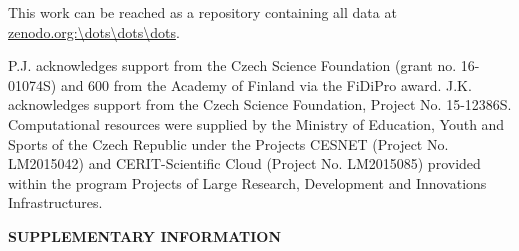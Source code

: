 \documentclass[aip,jcp,twocolumn]{revtex4}
\begin{document}




This work can be reached as a repository containing all data at \url{zenodo.org:\dots\dots\dots}.



\begin{acknowledgments}
P.J. acknowledges support from the Czech Science Foundation (grant no. 16-01074S) 
and 600 from the Academy of Finland via the FiDiPro award.
J.K. acknowledges support from the Czech Science Foundation, Project No. 15-12386S.
Computational resources were supplied by the Ministry of Education, Youth and Sports of the Czech Republic under the Projects CESNET (Project No. LM2015042) and CERIT-Scientific Cloud (Project No. LM2015085) provided within the program Projects of Large Research, Development and Innovations Infrastructures.
\end{acknowledgments}


\newpage
\newpage
\appendix






\begin{center}
{\bf SUPPLEMENTARY INFORMATION}
\end{center}
\end{document}
